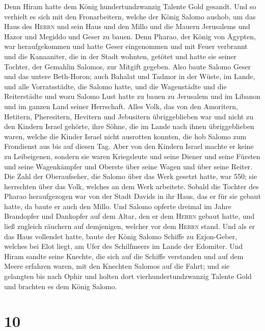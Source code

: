Denn Hiram hatte dem König hundertundzwanzig Talente Gold gesandt.
 Und so verhielt es sich mit den Fronarbeitern, welche
der König Salomo aushob, um das Haus des \textsc{Herrn} und sein Haus
und den Millo und die Mauern Jerusalems und Hazor und Megiddo und Geser
zu bauen.  Denn Pharao, der König von Ägypten, war
heraufgekommen und hatte Geser eingenommen und mit Feuer verbrannt und
die Kanaaniter, die in der Stadt wohnten, getötet und hatte sie seiner
Tochter, der Gemahlin Salomos, zur Mitgift gegeben.  Also
baute Salomo Geser und das untere Beth-Horon;  auch
Bahalat und Tadmor in der Wüste, im Lande, und alle Vorratsstädte,
 die Salomo hatte, und die Wagenstädte und die
Reiterstädte und wozu Salomo Lust hatte zu bauen zu Jerusalem und im
Libanon und im ganzen Land seiner Herrschaft.  Alles
Volk, das von den Amoritern, Hetitern, Pheresitern, Hevitern und
Jebusitern übriggeblieben war und nicht zu den Kindern Israel gehörte,
 ihre Söhne, die im Lande nach ihnen übriggeblieben
waren, welche die Kinder Israel nicht ausrotten konnten, die hob Salomo
zum Frondienst aus bis auf diesen Tag.  Aber von den
Kindern Israel machte er keine zu Leibeigenen, sondern sie waren
Kriegsleute und seine Diener und seine Fürsten und seine Wagenkämpfer
und Oberste über seine Wagen und über seine Reiter.  Die
Zahl der Oberaufseher, die Salomo über das Werk gesetzt hatte, war 550;
sie herrschten über das Volk, welches an dem Werk arbeitete.
 Sobald die Tochter des Pharao heraufgezogen war von der
Stadt Davids in ihr Haus, das er für sie gebaut hatte, da baute er auch
den Millo.  Und Salomo opferte dreimal im Jahre
Brandopfer und Dankopfer auf dem Altar, den er dem \textsc{Herrn} gebaut
hatte, und ließ zugleich räuchern auf demjenigen, welcher vor dem
\textsc{Herrn} stand.  Und als er das Haus vollendet
hatte, baute der König Salomo Schiffe zu Ezjon-Geber, welches bei Elot
liegt, am Ufer des Schilfmeers im Lande der Edomiter. 
Und Hiram sandte seine Knechte, die sich auf die Schiffe verstanden und
auf dem Meere erfahren waren, mit den Knechten Salomos auf die Fahrt;
 und sie gelangten bis nach Ophir und holten dort
vierhundertundzwanzig Talente Gold und brachten es dem König Salomo.

\hypertarget{section-9}{%
\section{10}\label{section-9}}

